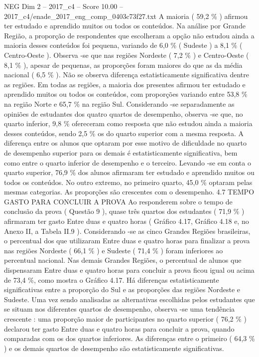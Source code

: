 \begin{textsample}{NEG Dim 2 – 2017\_c4 – Score 10.00 – 2017\_c4/enade\_2017\_eng\_comp\_0403c73f27.txt}
A maioria ( 59,2 \% ) afirmou ter estudado e aprendido muitos ou todos os conteúdos.
Na análise por Grande Região, a proporção de respondentes que escolheram a opção não estudou ainda a maioria desses conteúdos foi pequena, variando de 6,0 \% ( Sudeste ) a 8,1 \% ( Centro-Oeste ).
Observa -se que nas regiões Nordeste ( 7,2 \% ) e Centro-Oeste ( 8,1 \% ), apesar de pequenas, as proporções foram maiores do que as da média nacional ( 6,5 \% ).
Não se observa diferença estatisticamente significativa dentre as regiões.
Em todas as regiões, a maioria dos presentes afirmou ter estudado e aprendido muitos ou todos os conteúdos, com proporções variando entre 53,8 \% na região Norte e 65,7 \% na região Sul.
Considerando -se separadamente as opiniões de estudantes dos quatro quartos de desempenho, observa -se que, no quarto inferior, 9,8 \% ofereceram como resposta que não estudou ainda a maioria desses conteúdos, sendo 2,5 \% os do quarto superior com a mesma resposta.
A diferença entre os alunos que optaram por esse motivo de dificuldade no quarto de desempenho superior para os demais é estatisticamente significativa, bem como entre o quarto inferior de desempenho e o terceiro.
Levando -se em conta o quarto superior, 76,9 \% dos alunos afirmaram ter estudado e aprendido muitos ou todos os conteúdos.
No outro extremo, no primeiro quarto, 45,0 \% optaram pelas mesmas categorias.
As proporções são crescentes com o desempenho. 4.7 TEMPO GASTO PARA CONCLUIR A PROVA Ao responderem sobre o tempo de conclusão da prova ( Questão 9 ), quase três quartos dos estudantes ( 71,9 \% ) afirmaram ter gasto Entre duas e quatro horas ( Gráfico 4.17, Gráfico 4.18 e, no Anexo II, a Tabela II.9 ).
Considerando -se as cinco Grandes Regiões brasileiras, o percentual dos que utilizaram Entre duas e quatro horas para finalizar a prova nas regiões Nordeste ( 66,1 \% ) e Sudeste ( 71,4 \% ) foram inferiores ao percentual nacional.
Nas demais Grandes Regiões, o percentual de alunos que dispensaram Entre duas e quatro horas para concluir a prova ficou igual ou acima de 73,4 \%, como mostra o Gráfico 4.17.
Há diferenças estatisticamente significativas entre a proporção do Sul e as proporções das regiões Nordeste e Sudeste.
Uma vez sendo analisadas as alternativas escolhidas pelos estudantes que se situam nos diferentes quartos de desempenho, observa -se uma tendência crescente : uma proporção maior de participantes no quarto superior ( 76,2 \% ) declarou ter gasto Entre duas e quatro horas para concluir a prova, quando comparadas com os dos quartos inferiores.
As diferenças entre o primeiro ( 64,3 \% ) e os demais quartos de desempenho são estatisticamente significativas.

\end{textsample}
